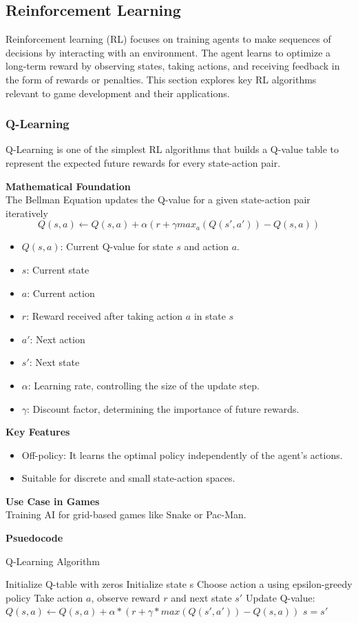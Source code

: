 \documentclass[12pt,oneside,openright,a4paper]{cpe-english-project}
\begin{document}
\subsection{Reinforcement Learning}
Reinforcement learning (RL) focuses on training agents to make sequences of decisions by interacting with an environment. The agent learns to optimize a long-term reward by observing states, taking actions, and receiving feedback in the form of rewards or penalties. This section explores key RL algorithms relevant to game development and their applications.
\subsubsection{Q-Learning}\cite{datacamp_q_learning}
Q-Learning is one of the simplest RL algorithms that builds a Q-value table to represent the expected future rewards for every state-action pair.\par
\textbf{Mathematical Foundation} \\
The Bellman Equation updates the Q-value for a given state-action pair iteratively
\begin{equation}
Q(s, a) \gets Q(s, a) + \alpha(r + \gamma max_{a}(Q(s', a')) - Q(s, a))
\end{equation}
\begin{itemize}
\item $Q(s,a)$: Current Q-value for state $s$ and action $a$.
\item $s$: Current state
\item $a$: Current action
\item $r$: Reward received after taking action $a$ in state $s$
\item $a'$: Next action
\item $s'$: Next state
\item $\alpha$: Learning rate, controlling the size of the update step.
\item $\gamma$: Discount factor, determining the importance of future rewards.
\end{itemize}
\textbf{Key Features}
\begin{itemize}
\item Off-policy: It learns the optimal policy independently of the agent’s actions.
\item Suitable for discrete and small state-action spaces.
\end{itemize}
\textbf{Use Case in Games} \\
Training AI for grid-based games like Snake or Pac-Man.\par
\textbf{Psuedocode}
\begin{algorithm}
\caption{Q-Learning Algorithm}\label{alg:QLA}
\begin{algorithmic}
\State Initialize Q-table with zeros
\State Initialize state s
	\State Choose action a using epsilon-greedy policy
	\State Take action $a$, observe reward $r$ and next state $s'$	
	\State  Update Q-value:
	\State  $Q(s, a) \gets Q(s, a) + \alpha * (r + \gamma * max(Q(s', a')) - Q(s, a))$
	\State $s = s'$
\EndWhile
\EndFor
\end{algorithmic}
\end{algorithm}
\end{document}
